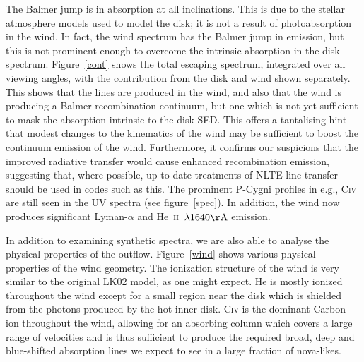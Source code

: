 \documentclass[preprint, a4paper, 11pt]{aastex}
\begin{document}
The Balmer jump is in absorption at all inclinations. This is 
due to the stellar atmosphere models used to model the disk;
it is not a result of photoabsorption in the wind.
In fact, the wind spectrum has the Balmer jump in emission, 
but this is not prominent enough
to overcome the intrinsic absorption in the disk spectrum. 
Figure~\ref{cont} shows the total escaping spectrum, integrated
over all viewing angles, with the contribution from the disk and wind
shown separately. This shows that the lines are produced in the wind,
and also that the wind is producing a Balmer recombination
continuum, but one which is not yet sufficient to mask the absorption 
intrinsic to the disk SED. This offers a tantalising hint
that modest changes to the kinematics of the wind
may be sufficient to boost the continuum emission of the wind.
Furthermore, it confirms our suspicions that the improved
radiative transfer would cause enhanced recombination emission,
suggesting that, where possible, up to date treatments of
NLTE line transfer should be used in codes such as this.
The prominent P-Cygni profiles in e.g., C\textsc{iv} are still seen
in the UV spectra (see figure~\ref{spec}). In addition, the wind 
now produces significant Lyman-$\alpha$ and
He~\textsc{ii}~$\lambda1640{\rm \AA}$  emission. 

In addition to examining synthetic spectra, we are also able to 
analyse the physical properties of the outflow.
Figure~\ref{wind} shows various physical properties
of the wind geometry. The ionization structure of the wind
is very similar to the original LK02 model, as one might expect.
He is mostly ionized throughout the wind except for a small region near
the disk which is shielded from the photons produced by the hot inner disk.
C\textsc{iv} is the dominant Carbon ion throughout the wind, allowing
for an absorbing column which covers a large range of velocities and is thus
sufficient to produce the required broad, deep and blue-shifted absorption lines
we expect to see in a large fraction of nova-likes.
\end{document}

